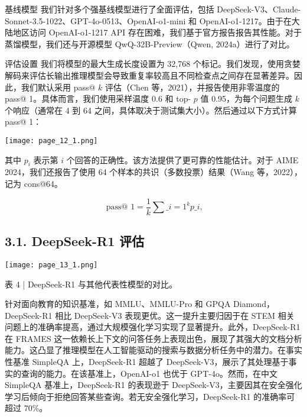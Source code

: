 \documentclass[12pt,a4paper]{report} %
\begin{document}
基线模型 我们针对多个强基线模型进行了全面评估，包括 DeepSeek-V3、Claude-Sonnet-3.5-1022、GPT-4o-0513、OpenAI-o1-mini 和 OpenAI-o1-1217。由于在大陆地区访问 OpenAI-o1-1217 API 存在困难，我们基于官方报告报告其性能。对于蒸馏模型，我们还与开源模型 QwQ-32B-Preview（Qwen, 2024a）进行了对比。


评估设置 我们将模型的最大生成长度设置为 32,768 个标记。我们发现，使用贪婪解码来评估长输出推理模型会导致重复率较高且不同检查点之间存在显著差异。因此，我们默认采用 pass@ $k$ 评估（Chen 等，2021），并报告使用非零温度的 pass@ 1。具体而言，我们使用采样温度 0.6 和 top- $p$ 值 0.95，为每个问题生成 $k$ 个响应（通常在 4 到 64 之间，具体取决于测试集大小）。然后通过以下方式计算 pass@ 1：\begin{center}
\texttt{[image: page\_12\_1.png]}
\end{center}
\begin{center}
其中 $p_{i}$ 表示第 $i$ 个回答的正确性。该方法提供了更可靠的性能估计。对于 AIME 2024，我们还报告了使用 64 个样本的共识（多数投票）结果（Wang 等，2022），记为 cons@64。
\end{center}
$$\text { pass@ } 1=\frac{1}{k} \sum\_{i=1}^{k} p\_{i},$$ 
\subsection*{3.1. DeepSeek-R1 评估}


\begin{center}
\texttt{[image: page\_13\_1.png]}
\end{center}
\begin{center}
表 4 | DeepSeek-R1 与其他代表性模型的对比。
\end{center}






针对面向教育的知识基准，如 MMLU、MMLU-Pro 和 GPQA Diamond，DeepSeek-R1 相比 DeepSeek-V3 表现更优。这一提升主要归因于在 STEM 相关问题上的准确率提高，通过大规模强化学习实现了显著提升。此外，DeepSeek-R1 在 FRAMES 这一依赖长上下文的问答任务上表现出色，展现了其强大的文档分析能力。这凸显了推理模型在人工智能驱动的搜索与数据分析任务中的潜力。在事实性基准 SimpleQA 上，DeepSeek-R1 超越了 DeepSeek-V3，展示了其处理基于事实的查询的能力。在该基准上，OpenAI-o1 也优于 GPT-4o。然而，在中文 SimpleQA 基准上，DeepSeek-R1 的表现逊于 DeepSeek-V3，主要因其在安全强化学习后倾向于拒绝回答某些查询。若无安全强化学习，DeepSeek-R1 的准确率可超过 $70 \%$。
\end{document}
